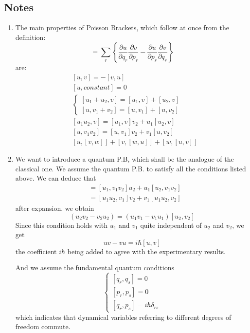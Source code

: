 \subsection{Notes}
\begin{enumerate}

	\item The main properties of Poisson Brackets, which follow at once from the definition:
	\begin{equation}
	[u,v]=\sum_r \left\{\frac{\partial u}{\partial q_r}\frac{\partial v}{\partial p_r} - \frac{\partial u}{\partial p_r} \frac{\partial v}{\partial q_r} \right\}
	\end{equation}
	are:
	\begin{align}
	&[u,v]=-[v,u]\\
	&[u,constant]=0 \\
	&\begin{cases}
	[u_1+u_2,v]=[u_1,v]+[u_2,v]\\
	[u,v_1+v_2]=[u,v_1]+[u,v_2]
	\end{cases}\\
	&[u_1u_2,v]=[u_1,v]v_2 + u_1[u_2,v]\\
	&[u,v_1v_2]=[u,v_1]v_2+v_1[u,v_2]\\
	&[u,[v,w]]+[v,[w,u]]+[w,[u,v]]
	\end{align}

	\item We want to introduce a quantum P.B, which shall be the analogue of the classical one. We assume the quantum P.B. to satisfy all the conditions listed above. We can deduce that
	\begin{align*}
	[u_1u_2,v_1v_2]&=[u_1,v_1v_2]u_2+u_1[u_2,v_1v_2]\\
		&=[u_1u_2,v_1]v_2+v_1[u_1u_2,v_2]
	\end{align*}
	after expansion, we obtain
	\begin{equation}
	[u_1,v_1](u_2v_2-v_2u_2)=(u_1v_1-v_1u_1)[u_2,v_2]
	\end{equation}
	Since this condition holds with $u_1$ and $v_1$ quite independent of $u_2$ and $v_2$, we get
	\begin{equation}
	uv-vu=i\hbar[u,v]
	\end{equation}
	the coefficient $i\hbar$ being added to agree with the experimentary results.

	And we assume the fundamental quantum conditions
	\begin{equation}
	\begin{cases}
	[q_r,q_s]=0\\
	[p_r,p_s]=0\\
	[q_r,p_s]=i\hbar\delta_{rs}
	\end{cases}
	\end{equation}
	which indicates that dynamical variables referring to different degrees of freedom commute.


\end{enumerate}
